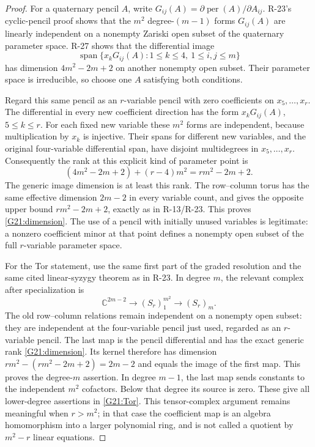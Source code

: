 \begin{proof}
For a quaternary pencil $A$, write
$G_{ij}(A)=\partial\operatorname{per}(A)/\partial A_{ij}$.
R-23's cyclic-pencil proof shows that the $m^2$ degree-$(m-1)$
forms $G_{ij}(A)$ are linearly independent on a nonempty
Zariski open subset of the quaternary parameter space. R-27
shows that the differential image
\[
 \operatorname{span}\{x_kG_{ij}(A):1\le k\le4,\ 1\le i,j\le m\}
\]
has dimension $4m^2-2m+2$ on another nonempty open subset.
Their parameter space is irreducible, so choose one $A$
satisfying both conditions.

Regard this same pencil as an $r$-variable pencil with zero
coefficients on $x_5,\ldots,x_r$. The differential in every
new coefficient direction has the form $x_kG_{ij}(A)$,
$5\le k\le r$. For each fixed new variable these $m^2$ forms
are independent, because multiplication by $x_k$ is injective.
Their spans for different new variables, and the original
four-variable differential span, have disjoint multidegrees
in $x_5,\ldots,x_r$. Consequently the rank at this explicit
kind of parameter point is
\[
 (4m^2-2m+2)+(r-4)m^2=rm^2-2m+2.
\]
The generic image dimension is at least this rank. The
row--column torus has the same effective dimension $2m-2$
in every variable count, and gives the opposite upper bound
$rm^2-2m+2$, exactly as in R-13/R-23. This proves
\eqref{G21:dimension}. The use of a pencil with initially
unused variables is legitimate: a nonzero coefficient minor
at that point defines a nonempty open subset of the full
$r$-variable parameter space.

For the Tor statement, use the same first part of the graded
resolution and the same cited linear-syzygy theorem as in
R-23. In degree $m$, the relevant complex after specialization is
\[
 \mathbb C^{2m-2}\longrightarrow (S_r)_1^{m^2}
       \longrightarrow (S_r)_m.
\]
The old row--column relations remain independent on a nonempty
open subset: they are independent at the four-variable pencil
just used, regarded as an $r$-variable pencil. The last map
is the pencil differential and has the exact generic rank
\eqref{G21:dimension}. Its kernel therefore has dimension
$rm^2-(rm^2-2m+2)=2m-2$ and equals the image of the first
map. This proves the degree-$m$ assertion.
In degree $m-1$, the last map sends constants to the independent
$m^2$ cofactors. Below that degree its source is zero. These
give all lower-degree assertions in \eqref{G21:Tor}.
This tensor-complex argument remains meaningful when $r>m^2$;
in that case the coefficient map is an algebra homomorphism
into a larger polynomial ring, and is not called a quotient
by $m^2-r$ linear equations.
\end{proof}

